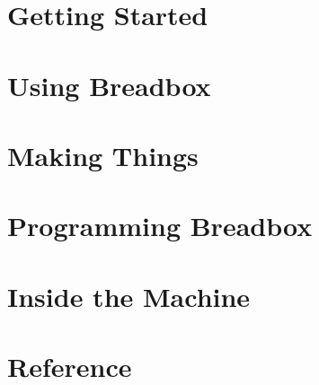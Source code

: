 \documentclass[11pt,oneside,openany]{book}
\begin{document}
\frontmatter


\tableofcontents

\mainmatter
\part{Getting Started}




\part{Using Breadbox}






\part{Making Things}


\part{Programming Breadbox}







\part{Inside the Machine}







\appendix
\part{Reference}






\backmatter
\printglossary[title={Glossary}]
\printindex
\printbibliography[heading=bibintoc,title={References}]
\end{document}
